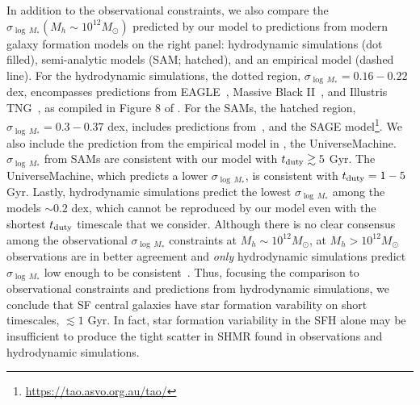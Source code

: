 \documentclass[12pt, letterpaper, preprint, tighten]{aastex62}
\begin{document}
In addition to the observational constraints, we also compare the $\sigma_{\log\,M_*}(M_h \sim 10^{12}M_\odot)$ 
predicted by our model to predictions from modern galaxy formation models 
on the right panel: hydrodynamic simulations (dot filled), semi-analytic models 
(SAM; hatched), and an empirical model (dashed line). For the hydrodynamic simulations, 
the dotted region, $\sigma_{\log\,M_*} = 0.16 - 0.22$ dex, encompasses 
predictions from EAGLE~\citep{mcalpine2016}, Massive Black II~\citep{khandai2015}, 
and Illustris TNG~\citep{pillepich2018}, as compiled in Figure 8 of \cite{wechsler2018}. 
For the SAMs, the hatched region, $\sigma_{\log\,M_*} = 0.3 - 0.37$ dex,
includes predictions from~\cite{lu2014, somerville2012}, and the SAGE 
model\footnote{\url{https://tao.asvo.org.au/tao/}}. We also include the 
prediction from the empirical model in \cite{behroozi2018}, the {\sc UniverseMachine}. 
$\sigma_{\log\,M_*}$ from SAMs are consistent with our model with 
$t_{\rm duty} \gtrsim 5$ Gyr. The {\sc UniverseMachine}, which predicts a 
lower $\sigma_{\log\,M_*}$, is consistent with $t_{\rm duty} = 1 - 5$ Gyr. 
Lastly, hydrodynamic simulations predict the lowest $\sigma_{\log\,M_*}$ among 
the models $\sim 0.2$ dex, which cannot be reproduced by our model even with the 
shortest $t_{\rm duty}$ timescale that we consider. Although there is no clear 
consensus among the observational $\sigma_{\log\,M_*}$ constraints at $M_h \sim 10^{12} M_\odot$, 
at $M_h > 10^{12} M_\odot$ observations are in better agreement and {\em only} 
hydrodynamic simulations predict $\sigma_{\log\,M_*}$ low 
enough to be consistent~\citep{wechsler2018}. Thus, focusing the comparison 
to observational constraints and predictions from hydrodynamic simulations, 
we conclude that SF central galaxies have star formation varability on short 
timescales, $\lesssim 1$ Gyr. In fact, star formation variability in the SFH 
alone may be insufficient to produce the tight scatter in SHMR found in 
observations and hydrodynamic simulations. 

\end{document}
